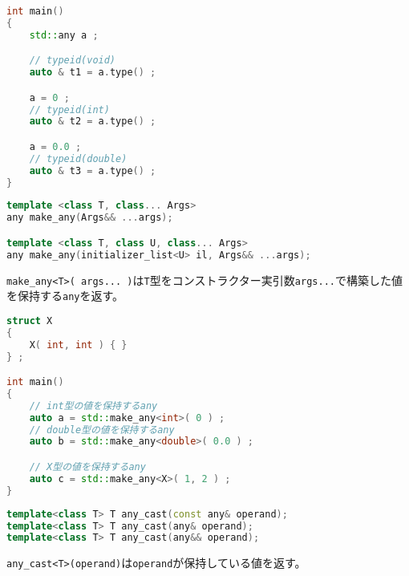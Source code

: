 \begin{lstlisting}[language=C++]
int main()
{
    std::any a ;

    // typeid(void)
    auto & t1 = a.type() ;

    a = 0 ;
    // typeid(int)
    auto & t2 = a.type() ;

    a = 0.0 ;
    // typeid(double)
    auto & t3 = a.type() ;
}
\end{lstlisting}

%

%

\bgroup
\begin{lstlisting}[language=C++]
template <class T, class... Args>
any make_any(Args&& ...args);

template <class T, class U, class... Args>
any make_any(initializer_list<U> il, Args&& ...args);
\end{lstlisting}
\egroup

\lstinline!make_any<T>( args... )!は\lstinline!T!型をコンストラクター実引数\lstinline!args...!で構築した値を保持する\lstinline!any!を返す。

\begin{lstlisting}[language=C++]
struct X
{
    X( int, int ) { }
} ;

int main()
{
    // int型の値を保持するany
    auto a = std::make_any<int>( 0 ) ;
    // double型の値を保持するany
    auto b = std::make_any<double>( 0.0 ) ;

    // X型の値を保持するany
    auto c = std::make_any<X>( 1, 2 ) ;
}
\end{lstlisting}

%

\bgroup
\begin{lstlisting}[language=C++]
template<class T> T any_cast(const any& operand);
template<class T> T any_cast(any& operand);
template<class T> T any_cast(any&& operand);
\end{lstlisting}
\egroup

\lstinline!any_cast<T>(operand)!は\lstinline!operand!が保持している値を返す。

